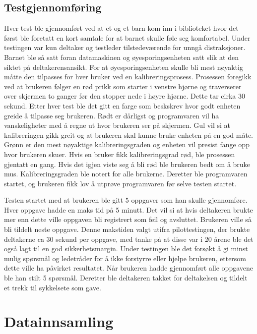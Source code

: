 \subsection{Testgjennomføring}
Hver test ble gjennomført ved at et og et barn kom inn i biblioteket hvor det først ble foretatt en kort
samtale for at barnet skulle føle seg komfortabel. Under testingen var kun deltaker og testleder
tilstedeværende for unngå distraksjoner. Barnet ble så satt foran datamaskinen og øyesporingsenheten satt slik at den siktet på deltakerensansikt. For at øyesporingsenheten skulle bli mest nøyaktig måtte den tilpasses for hver bruker ved
en kalibreringsprosess. Prosessen foregikk ved at brukeren følger en rød prikk som starter i
venstre hjørne og traverserer over skjermen to ganger før den stopper nede i høyre hjørne. Dette
tar cirka 30 sekund. Etter hver test ble det gitt en farge som beskskrev hvor godt enheten greide å
tilpasse seg brukeren. Rødt er dårligst og programvaren vil ha vanskeligheter med å regne ut hvor
brukeren ser på skjermen. Gul vil si at kalibreringen gikk greit og at brukeren skal kunne bruke
enheten på en god måte. Grønn er den mest nøyaktige kalibreringsgraden og enheten vil presist
fange opp hvor brukeren skuer. Hvis en bruker fikk kalibreringsgrad rød, ble prosessen gjentatt en
gang. Hvis det igjen viste seg å bli rød ble brukeren bedt om å bruke mus. Kalibreringsgraden ble
notert for alle brukerne. Deretter ble programvaren startet, og brukeren fikk lov å utprøve programvaren før selve testen startet.

Testen startet med at brukeren ble  gitt 5 oppgaver som han skulle gjennomføre. Hver oppgave hadde en maks
tid på 5 minutt. Det vil si at hvis deltakeren brukte mer enn dette ville oppgaven bli registrert som feil og avsluttet. Brukeren ville så bli tildelt neste oppgave. Denne makstiden valgt utifra pilottestingen, der brukte deltakerne ca 30 sekund per oppgave, med tanke på at disse var i 20 årene ble det også lagt til en god sikkerhetsmargin. Under testingen ble det forsøkt å gi minst mulig spørsmål og ledetråder for å ikke forstyrre eller hjelpe brukeren, ettersom dette ville ha påvirket resultatet. Når brukeren hadde gjennomført alle oppgavene ble han stilt 5 spørsmål. Deretter ble deltakeren
takket for deltakelsen og tildelt et trekk til sykkelsete som gave.

\section{Datainnsamling}

